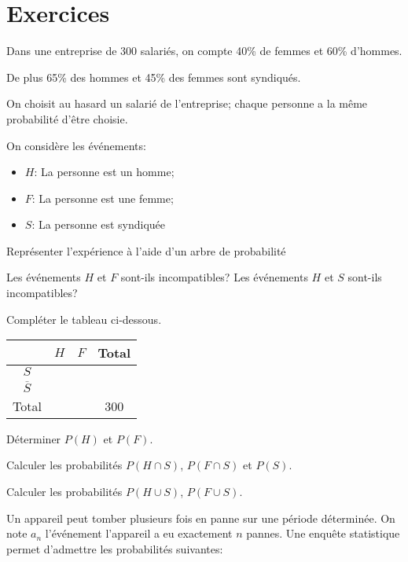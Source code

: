 \documentclass[a4paper,12pt]{scrartcl}
\begin{document}
\section*{Exercices}


Dans une entreprise de 300 salariés, on compte 40\% de femmes et 60\% d'hommes.

De plus 65\% des hommes et 45\% des femmes sont syndiqués.

On choisit au hasard un salarié de l'entreprise; chaque personne a la même probabilité d'être choisie.

On considère les événements:

\begin{itemize}
    \item $H$: \og{}La personne est un homme\fg{};
    \item $F$: \og{}La personne est une femme\fg{};
    \item $S$: \og{}La personne est syndiquée\fg{}
\end{itemize}

\question{}
Représenter l'expérience à l'aide d'un arbre de probabilité

\question{}
Les événements $H$ et $F$ sont-ils incompatibles? Les événements $H$ et $S$ sont-ils incompatibles?

\question{}
Compléter le tableau ci-dessous.

\begin{center}
 \begin{tabular}{|c|c|c|c|}
    \hline
    & $H$ & $F$ & Total \\ \hline
    $S$            &  \hspace{2cm}   &  \hspace{2cm}   &   \hspace{2cm}    \\ \hline
    $\overline{S}$ &     &     &       \\ \hline
    Total          &     &     & 300   \\ \hline
\end{tabular}
\end{center}

\question{}
Déterminer $P(H)$ et $P(F)$.

\question{}
Calculer les probabilités $P(H \cap S)$, $P(F \cap S)$ et $P(S)$.

\question{}
Calculer les probabilités $P(H \cup S)$, $P(F \cup S)$.

\exo[0]{}
Un appareil peut tomber plusieurs fois en panne sur une période déterminée. On note $a_n$ l'événement \og{}l'appareil a eu exactement $n$ pannes\fg{}. Une enquête statistique permet d'admettre les probabilités suivantes:
\end{document}
